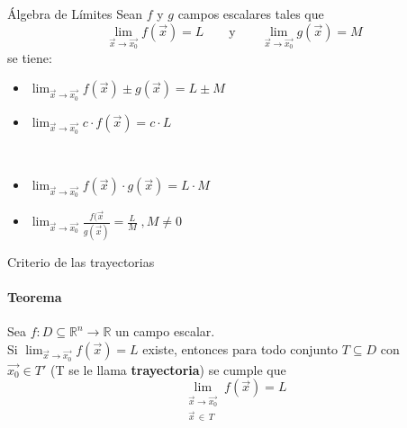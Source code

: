 \documentclass{plantillaPPT}
\begin{document}
\begin{frame}{Álgebra de Límites}
Sean \(f\) y \(g\) campos escalares tales que
\[
\lim_{\vec{x}\to\vec{x_0}} f(\vec{x}) = L \qquad \text{y} \qquad \lim_{\vec{x}\to\vec{x_0}} g(\vec{x}) = M
\]
se tiene:\\[5pt]
\begin{minipage}{0.5\textwidth}
\begin{itemize}
    \item \(\displaystyle \lim_{\vec{x}\to\vec{x_0}}  f(\vec{x})\pm g(\vec{x}) = L \pm M\)
\end{itemize}
\end{minipage}%
\begin{minipage}{0.5\textwidth}
\begin{itemize}
    \item \(\displaystyle \lim_{\vec{x}\to\vec{x_0}}  c\cdot f(\vec{x}) = c\cdot L\)
\end{itemize}
\end{minipage}\\
\vspace{5pt}
\begin{minipage}{0.5\textwidth}
\begin{itemize}
    \item \(\displaystyle \lim_{\vec{x}\to\vec{x_0}}  f(\vec{x})\cdot g(\vec{x}) = L\cdot M\)
\end{itemize}
\end{minipage}%
\begin{minipage}{0.5\textwidth}
\begin{itemize}
    \item \(\displaystyle \lim_{\vec{x}\to\vec{x_0}}  \frac{f(\vec{x}}{g(\vec{x})} =\frac{L}{M}\; ,M\neq0\)
\end{itemize}
\end{minipage}
    
\end{frame}

\begin{frame}{Criterio de las trayectorias}
\framesubtitle{Teorema}

\begin{teorema}
    Sea \(f:D\subseteq\mathbb{R}^n\to\mathbb{R}\) un campo escalar.\\[4pt]
    Si \(\displaystyle \lim_{\vec{x}\to\vec{x_0}}  f(\vec{x}) = L\) existe, entonces para todo conjunto \(T\subseteq D\) con \\[4pt]
    \(\vec{x_0}\in T'\) (T se le llama \textbf{trayectoria}) se cumple que 
    \[
    \lim_{\substack{\vec{x}\to \vec{x_0} \\ \vec{x}\,\in\, T}} f(\vec{x}) = L
    \]
\end{teorema}
    
\end{frame}
\end{document}
